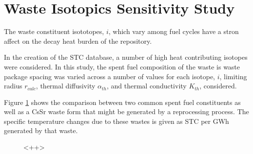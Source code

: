 \section{Waste Isotopics Sensitivity Study}\label{sec:isotopics}
The waste constituent isototopes, $i$, which vary among fuel cycles have a 
stron affect on the decay heat burden of the repository. 

In the creation of the \gls{STC} database, a number of high heat contributing 
isotopes were considered. In this study, the spent fuel composition of the 
waste is waste package spacing was varied across a number of values for each 
isotope, $i$, limiting radius $r_{calc}$, thermal diffusivity $\alpha_{th}$, 
and thermal conductivity $K_{th}$, considered.  

Figure \ref{fig:isotopics_sensitivity} shows the comparison between two common 
spent fuel constituents as well as a CsSr waste form that might be generated 
by a reprocessing process. The specific temperature changes due to these wastes 
is given as STC per GWh generated by that waste. 

\begin{figure}[htbp!]
\begin{center}
\end{center}
\caption[Thermal Sensitivity to Varying Waste Composition]{<++>}
\label{fig:isotopics_sensitivity}
\end{figure}



